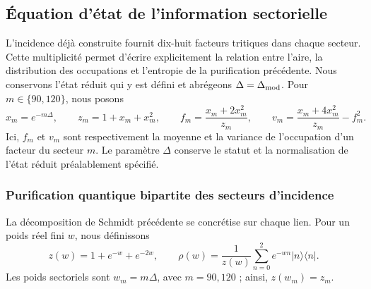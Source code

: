 \subsection{Équation d'état de l'information sectorielle}
\label{v:v:ant:sec:ii-ecuacion-informacion}

L'incidence déjà construite fournit dix-huit facteurs tritiques dans
chaque secteur. Cette multiplicité permet d'écrire explicitement la
relation entre l'aire, la distribution des occupations et l'entropie de
la purification précédente. Nous conservons l'état réduit qui y est défini
et abrégeons $\Delta=\Delta_{\rm mod}$. Pour $m\in\{90,120\}$, nous posons
\begin{equation}
 x_m=e^{-m\Delta},\qquad z_m=1+x_m+x_m^2,\qquad
 f_m=\frac{x_m+2x_m^2}{z_m},\qquad
 v_m=\frac{x_m+4x_m^2}{z_m}-f_m^2.
 \label{v:v:ant:eq:ii-sector-momentos}
\end{equation}
Ici, $f_m$ et $v_m$ sont respectivement la moyenne et la variance de
l'occupation d'un facteur du secteur $m$. Le paramètre $\Delta$ conserve
le statut et la normalisation de l'état réduit préalablement
spécifié.

\subsubsection{Purification quantique bipartite des secteurs d’incidence}
\label{v:v:ant:sec:ii-area-purificacion-producto}

La décomposition de Schmidt précédente se concrétise sur chaque lien.
Pour un poids réel fini \(w\), nous définissons
\[
 z(w)=1+e^{-w}+e^{-2w},\qquad
 \rho(w)=\frac1{z(w)}\sum_{n=0}^2e^{-wn}|n\rangle\langle n|.
\]
Les poids sectoriels sont \(w_m=m\Delta\), avec \(m=90,120\) ;
ainsi, \(z(w_m)=z_m\).

